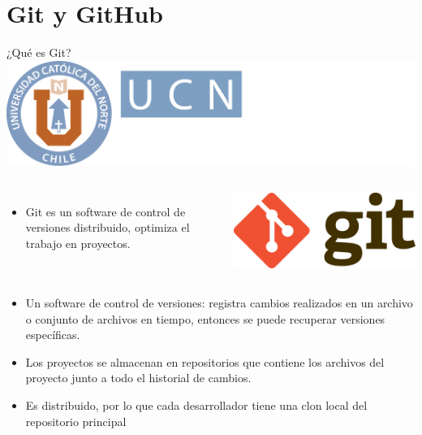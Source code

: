 \documentclass[12pt,a4paper,usenames,x11names,compress]{beamer}
\begin{document}
\section{Git y GitHub}
\begin{frame}{¿Qué es Git? \hfill \includegraphics[scale=.1]{eciem.png}}
\begin{columns}
 \begin{itemize}
 \justifying
    \item Git es un software de control de versiones distribuido,  optimiza el trabajo en proyectos.
 \end{itemize}

\includegraphics[scale=.1]{git.png}  
\end{columns}
\begin{itemize}
\justifying
\item Un software de control de versiones: registra cambios realizados en un archivo o conjunto de archivos en tiempo, entonces se puede recuperar versiones específicas.
\item Los proyectos se almacenan en repositorios que contiene los archivos del proyecto junto a todo el historial de cambios. 
\item Es distribuido, por lo que cada desarrollador tiene una clon local del repositorio principal 
\end{itemize}
\end{frame}
\end{document}
